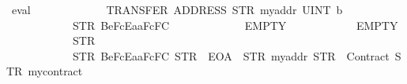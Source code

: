\begin{isabellebody}
\endisatagproof
{\isafoldproof}%
%
\isadelimproof
\isanewline
%
\endisadelimproof
\isanewline
{}\isamarkupfalse%
\ {\isachardoublequoteopen}eval{}\ {}{}{}{}\isanewline
\ \ \ \ \ \ \ \ \ \ \ \ {\isacharparenleft}{\kern0pt}TRANSFER\ {\isacharparenleft}{\kern0pt}ADDRESS\ {\isacharparenleft}{\kern0pt}STR\ {\isacharprime}{\kern0pt}{\isacharprime}{\kern0pt}myaddr{\isacharprime}{\kern0pt}{\isacharprime}{\kern0pt}{\isacharparenright}{\kern0pt}{\isacharparenright}{\kern0pt}\ {\isacharparenleft}{\kern0pt}UINT\ b{}{}{}\ {}{}{\isacharparenright}{\kern0pt}{\isacharparenright}{\kern0pt}\isanewline
\ \ \ \ \ \ \ \ \ \ \ \ {\isacharparenleft}{\kern0pt}STR\ {\isacharprime}{\kern0pt}{\isacharprime}{\kern0pt}{}{}{}Be{}{}{}{}FcEa{}{}aF{}{}{}{}{}{}{}{}{}c{}{}F{}{}{}{}{}{}C{}{}{}{\isacharprime}{\kern0pt}{\isacharprime}{\kern0pt}{\isacharparenright}{\kern0pt}\ \isanewline
\ \ \ \ \ \ \ \ \ \ \ \ EMPTY\isanewline
\ \ \ \ \ \ \ \ \ \ \ \ EMPTY\isanewline
\ \ \ \ \ \ \ \ \ \ \ \ {\isacharparenleft}{\kern0pt}STR\ {\isacharprime}{\kern0pt}{\isacharprime}{\kern0pt}{}{\isacharprime}{\kern0pt}{\isacharprime}{\kern0pt}{\isacharparenright}{\kern0pt}\isanewline
\ \ \ \ \ \ \ \ \ \ \ \ {\isacharbrackleft}{\kern0pt}{\isacharparenleft}{\kern0pt}STR\ {\isacharprime}{\kern0pt}{\isacharprime}{\kern0pt}{}{}{}Be{}{}{}{}FcEa{}{}aF{}{}{}{}{}{}{}{}{}c{}{}F{}{}{}{}{}{}C{}{}{}{\isacharprime}{\kern0pt}{\isacharprime}{\kern0pt}{\isacharcomma}{\kern0pt}\ STR\ {\isacharprime}{\kern0pt}{\isacharprime}{\kern0pt}{}{}{}{\isacharprime}{\kern0pt}{\isacharprime}{\kern0pt}{\isacharcomma}{\kern0pt}\ EOA{\isacharcomma}{\kern0pt}\ {}{\isacharparenright}{\kern0pt}{\isacharcomma}{\kern0pt}\ {\isacharparenleft}{\kern0pt}STR\ {\isacharprime}{\kern0pt}{\isacharprime}{\kern0pt}myaddr{\isacharprime}{\kern0pt}{\isacharprime}{\kern0pt}{\isacharcomma}{\kern0pt}\ STR\ {\isacharprime}{\kern0pt}{\isacharprime}{\kern0pt}{}{}{}{\isacharprime}{\kern0pt}{\isacharprime}{\kern0pt}{\isacharcomma}{\kern0pt}\ Contract\ {\isacharparenleft}{\kern0pt}STR\ {\isacharprime}{\kern0pt}{\isacharprime}{\kern0pt}mycontract{\isacharprime}{\kern0pt}{\isacharprime}{\kern0pt}{\isacharparenright}{\kern0pt}{\isacharcomma}{\kern0pt}\ {}{\isacharparenright}{\kern0pt}{\isacharbrackright}{\kern0pt}\ \isanewline

\end{isabellebody}
